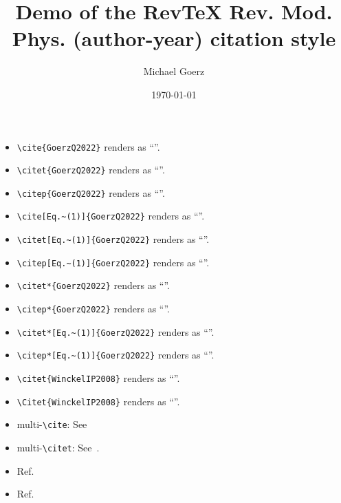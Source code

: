 \documentclass[aps,rmp,onecolumn,noshowpacs,superscriptaddress,preprintnumbers,%
kamsmath,amssymb,notitlepage,letterpaper]{revtex4-2}
\def\Author{Michael Goerz}
\def\Title{Demo of the  RevTeX Rev. Mod. Phys. (author-year) citation style}
\begin{document}
\title{\Title}
\author{\Author}
\date{\today}

\maketitle


\begin{itemize}
  \item \verb|\cite{GoerzQ2022}| renders as ``\cite{GoerzQ2022}''.
  \item \verb|\citet{GoerzQ2022}| renders as ``\citet{GoerzQ2022}''.
  \item \verb|\citep{GoerzQ2022}| renders as ``\citep{GoerzQ2022}''.
  \item \verb|\cite[Eq.~(1)]{GoerzQ2022}| renders as ``\cite[Eq.~(1)]{GoerzQ2022}''.
  \item \verb|\citet[Eq.~(1)]{GoerzQ2022}| renders as ``\citet[Eq.~(1)]{GoerzQ2022}''.
  \item \verb|\citep[Eq.~(1)]{GoerzQ2022}| renders as ``\citep[Eq.~(1)]{GoerzQ2022}''.
  \item \verb|\citet*{GoerzQ2022}| renders as ``\citet*{GoerzQ2022}''.
  \item \verb|\citep*{GoerzQ2022}| renders as ``\citep*{GoerzQ2022}''.
  \item \verb|\citet*[Eq.~(1)]{GoerzQ2022}| renders as ``\citet*[Eq.~(1)]{GoerzQ2022}''.
  \item \verb|\citep*[Eq.~(1)]{GoerzQ2022}| renders as ``\citep*[Eq.~(1)]{GoerzQ2022}''.
  \item \verb|\citet{WinckelIP2008}| renders as ``\citet{WinckelIP2008}''.
  \item \verb|\Citet{WinckelIP2008}| renders as ``''.
  \item multi-\verb|\cite|: See~\cite[and references therein]{WinckelIP2008,BrumerShapiro2003,BrifNJP2010,Shapiro2012,KochJPCM2016,GoerzQ2022,SolaAAMOP2018,MorzhinRMS2019,KochEPJQT2022}
  \item multi-\verb|\citet|: See~\citet[and references therein]{WinckelIP2008,BrumerShapiro2003,BrifNJP2010,Shapiro2012,KochJPCM2016,GoerzQ2022,SolaAAMOP2018,MorzhinRMS2019,KochEPJQT2022}.
  \item Ref.~\cite{NielsenChuangCh10QEC, AnderssonSGS2014, SuominenSGS2014, DevoretLH1995, PaszkeNIPS2019,JuhlARNMRS2020,PercontiSPIE2016,Giles2008}
  \item Ref.~\cite{GoerzPhd2015, Giles2008b,Nolting1997Coulomb}
\end{itemize}
\end{document}
